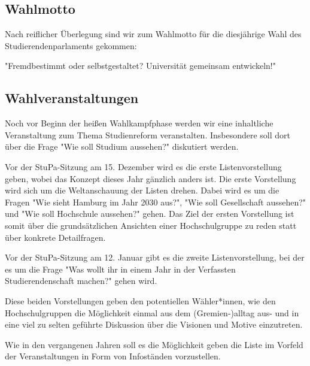 \documentclass[ngerman,headheight=70pt]{scrartcl}
\begin{document}
    \subsection{Wahlmotto}

    Nach reiflicher Überlegung sind wir zum Wahlmotto für die diesjährige Wahl
    des Studierendenparlaments gekommen:

    "Fremdbestimmt oder selbstgestaltet? Universität gemeinsam entwickeln!"

    \subsection{Wahlveranstaltungen}

    Noch vor Beginn der heißen Wahlkampfphase werden wir eine inhaltliche Veranstaltung
    zum Thema Studienreform veranstalten. Insbesondere soll dort über die Frage
    "Wie soll Studium aussehen?" diskutiert werden.

    Vor der StuPa-Sitzung am 15. Dezember wird es die erste Listenvorstellung
    geben, wobei das Konzept dieses Jahr gänzlich anders ist. Die erste
    Vorstellung wird sich um die Weltanschauung der Listen drehen.
    Dabei wird es um die Fragen "Wie sieht Hamburg im Jahr 2030 aus?",
    "Wie soll Gesellschaft aussehen?" und "Wie soll Hochschule aussehen?"
    gehen. Das Ziel der ersten Vorstellung ist somit über die grundsätzlichen
    Ansichten einer Hochschulgruppe zu reden statt über konkrete Detailfragen.

    Vor der StuPa-Sitzung am 12. Januar gibt es die zweite Listenvorstellung,
    bei der es um die Frage "Was wollt ihr in einem Jahr in der Verfassten
    Studierendenschaft machen?" gehen wird.

    Diese beiden Vorstellungen geben den potentiellen Wähler*innen, wie den
    Hochschulgruppen die Möglichkeit einmal aus dem (Gremien-)alltag aus- und in
    eine viel zu selten geführte Diskussion über die Visionen und Motive einzutreten.

    Wie in den vergangenen Jahren soll es die Möglichkeit geben die Liste im
    Vorfeld der Veranstaltungen in Form von Infoständen vorzustellen.
\end{document}
